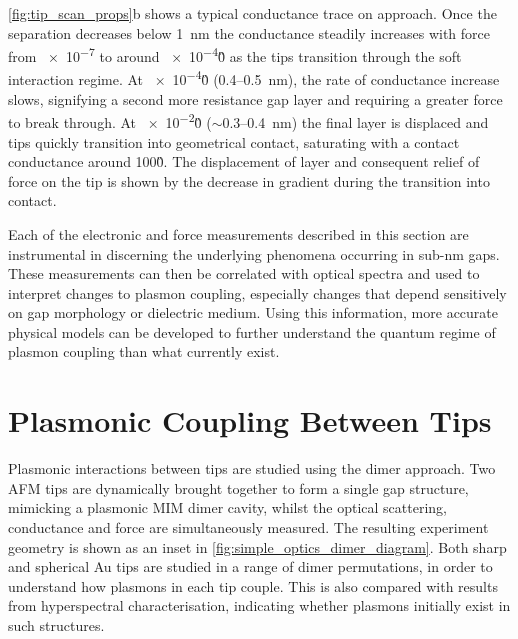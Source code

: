 \documentclass[a4paper]{article}
\begin{document}
\autoref{fig:tip_scan_props}b shows a typical conductance trace on approach. Once the separation decreases below \SI{1}{nm} the conductance steadily increases with force from \num{e-7} to around \num{e-4}\G0 as the tips transition through the soft interaction regime. At \num{e-4}\G0 (0.4--\SI{0.5}{nm}), the rate of conductance increase slows, signifying a second more resistance gap layer and requiring a greater force to break through. At \num{e-2}\G0 ($\sim$0.3--\SI{0.4}{nm}) the final layer is displaced and tips quickly transition into geometrical contact, saturating with a contact conductance around 100\G0. The displacement of layer and consequent relief of force on the tip is shown by the decrease in gradient during the transition into contact.

Each of the electronic and force measurements described in this section are instrumental in discerning the underlying phenomena occurring in sub-nm gaps. These measurements can then be correlated with optical spectra and used to interpret changes to plasmon coupling, especially changes that depend sensitively on gap morphology or dielectric medium. Using this information, more accurate physical models can be developed to further understand the quantum regime of plasmon coupling than what currently exist.

\section{Plasmonic Coupling Between Tips}


Plasmonic interactions between tips are studied using the dimer approach. Two AFM tips are dynamically brought together to form a single gap structure, mimicking a plasmonic MIM dimer cavity, whilst the optical scattering, conductance and force are simultaneously measured. The resulting experiment geometry is shown as an inset in \autoref{fig:simple_optics_dimer_diagram}. Both sharp and spherical Au tips are studied in a range of dimer permutations, in order to understand how plasmons in each tip couple. This is also compared with results from hyperspectral characterisation, indicating whether plasmons initially exist in such structures.
\end{document}
